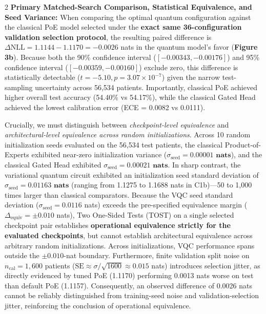 \documentclass[10pt,a4paper,twoside]{article}
\begin{document}
\begin{multicols}{2}
\noindent\textbf{Primary Matched-Search Comparison, Statistical Equivalence, and Seed Variance:} When comparing the optimal quantum configuration against the classical PoE model selected under the \textbf{exact same 36-configuration validation selection protocol}, the resulting paired difference is $\Delta\text{NLL} = 1.1144 - 1.1170 = \mathbf{-0.0026}$ nats in the quantum model's favor (\textbf{Figure 3b}). Because both the 90\% confidence interval ($[-0.00343, -0.00176]$) and 95\% confidence interval ($[-0.00359, -0.00160]$) exclude zero, this difference is statistically detectable ($t = -5.10, p = 3.07 \times 10^{-7}$) given the narrow test-sampling uncertainty across 56,534 patients. Importantly, classical PoE achieved higher overall test accuracy (54.40\% vs 54.17\%), while the classical Gated Head achieved the lowest calibration error (ECE = 0.0082 vs 0.0111).

Crucially, we must distinguish between \textit{checkpoint-level equivalence} and \textit{architectural-level equivalence across random initializations}. Across 10 random initialization seeds evaluated on the 56,534 test patients, the classical Product-of-Experts exhibited near-zero initialization variance ($\sigma_{\text{seed}} = \mathbf{0.00001\text{ nats}}$), and the classical Gated Head exhibited $\sigma_{\text{seed}} = \mathbf{0.00021\text{ nats}}$. In sharp contrast, the variational quantum circuit exhibited an initialization seed standard deviation of $\sigma_{\text{seed}} = \mathbf{0.01163\text{ nats}}$ (ranging from 1.1275 to 1.1688 nats in C1b)---50 to 1,000 times larger than classical comparators. Because the VQC seed standard deviation ($\sigma_{\text{seed}} = 0.0116$ nats) exceeds the pre-specified equivalence margin ($\Delta_{\text{equiv}} = \pm 0.010$ nats), Two One-Sided Tests (TOST) on a single selected checkpoint pair establishes \textbf{operational equivalence strictly for the evaluated checkpoints}, but cannot establish architectural equivalence across arbitrary random initializations. Across initializations, VQC performance spans outside the $\pm 0.010$-nat boundary. Furthermore, finite validation split noise on $n_{\text{cal}} = 1,600$ patients ($\text{SE} \approx \sigma / \sqrt{1600} \approx 0.015$ nats) introduces selection jitter, as directly evidenced by tuned PoE (1.1170) performing 0.0013 nats worse on test than default PoE (1.1157). Consequently, an observed difference of 0.0026 nats cannot be reliably distinguished from training-seed noise and validation-selection jitter, reinforcing the conclusion of operational equivalence.


\end{multicols}
\end{document}
